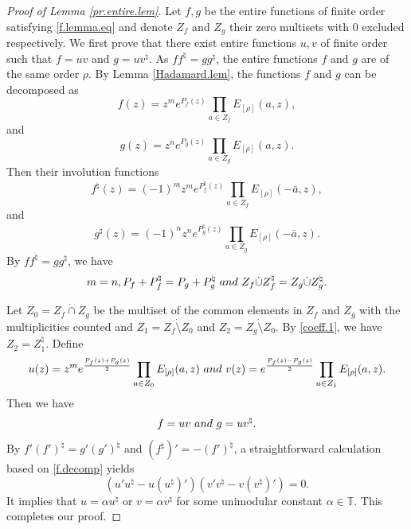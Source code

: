 \documentclass[11pt,oneside,reqno]{amsart}
\numberwithin{equation}{section}
\def\T{ {\mathbb T} }
\begin{document}
\medskip 
\begin{proof}[Proof of Lemma \ref{pr.entire.lem}]
Let $f, g$ be the entire functions of finite order satisfying \eqref{f.lemma.eq} and denote   $Z_f$ and $Z_g$ their zero multisets with $0$ excluded respectively.  We first prove that there exist entire functions $u, v$ of finite order  such that $f=uv$ and $g=uv^\natural$. As $ff^\natural=gg^\natural$, the entire functions $f$ and $g$ are of the same order $\rho$.
  By Lemma \ref{Hadamard.lem},  the functions $f$ and $g$ can be decomposed as
 \begin{equation*}
 f(z)=z^{m}e^{P_f(z)}\prod_{a\in Z_f}E_{[\rho]}(a,z),
 \end{equation*}
 and
 \begin{equation*}
 g(z)=z^{n}e^{P_g(z)}\prod_{a\in Z_g}E_{[\rho]}(a,z).
 \end{equation*} Then their involution functions
  \begin{equation*}
 f^\natural(z)=(-1)^mz^{m}e^{P_f^\natural (z)}\prod_{a\in Z_f}E_{[\rho]}(-\bar a,z),
 \end{equation*}
 and
 \begin{equation*}
 g^\natural(z)=(-1)^nz^{n}e^{P_g^\natural(z)}\prod_{a\in Z_g}E_{[\rho]}(-\bar a,z).
 \end{equation*}
 By $ff^\natural =gg^\natural$, we have
 \begin{equation}\label{coeff.1}
 m=n, P_f+P_f^\natural=P_g+P_g^\natural{\rm \  and\ }Z_f\dot{\cup} Z_f^\natural =Z_g \dot{\cup} Z_g^\natural.%
 \end{equation}%

  Let $Z_0=Z_f\dot{\cap }Z_g$  be the multiset of the common elements in $Z_f$ and $Z_g$ with the multiplicities counted and $Z_1=Z_f\dot{\setminus }Z_0$ and $Z_2=Z_g\dot{\setminus} Z_0$.  By \eqref{coeff.1}, we have $Z_2=Z_1^\natural$. Define
 \begin{equation*}
 u(z)=z^m e^{\frac{P_f(z)+P_g(z)}{2}}\prod_{a\in Z_0} E_{[\rho]}(a,z){\rm\ and\ } v(z)=e^{\frac{P_f(z)-P_g(z)}{2}}\prod_{a\in Z_1} E_{[\rho]}(a,z).
 \end{equation*}
 Then we have \begin{equation}\label{f.decomp}
 f=uv{\rm\  and\ }g=uv^\natural.
 \end{equation}
 By $f'(f')^\natural=g'(g')^\natural$ and $(f^\natural)'=-(f')^\natural$,  a straightforward calculation based on  \eqref{f.decomp} yields 
\begin{equation*}
(u'u^\natural-u(u^\natural)')(v'v^\natural-v(v^\natural)')=0.
\end{equation*}
It implies that $u=\alpha u^\natural$ or $v=\alpha v^\natural$ for some unimodular  constant $\alpha\in\T$. This completes our proof.
 \end{proof}
\end{document}
